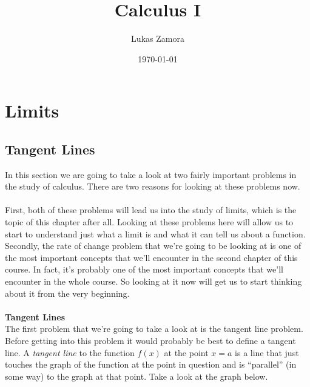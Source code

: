 \documentclass[10pt,reqno]{book}
\title{Calculus I}
\author{Lukas Zamora}
\date{\today}
\begin{document}
	
	\maketitle
	\tableofcontents
	
	\chapter{Limits}\normalsize

	\section{Tangent Lines}

	In this section we are going to take a look at two fairly important problems in the study of calculus. There are two reasons for looking at these problems now. \\ \\
	First, both of these problems will lead us into the study of limits, which is the topic of this chapter after all. Looking at these problems here will allow us to start to understand just what a limit is and what it can tell us about a function. Secondly, the rate of change problem that we're going to be looking at is one of the most important concepts that we'll encounter in the second chapter of this course. In fact, it’s probably one of the most important concepts that we'll encounter in the whole course. So looking at it now will get us to start thinking about it from the very beginning.\\ \\
	\textbf{Tangent Lines}\\
	The first problem that we're going to take a look at is the tangent line problem. Before getting into this problem it would probably be best to define a tangent line. A \textit{tangent line} to the function $ f(x) $ at the point $ x = a $ is a line that just touches the graph of the function at the point in question and is ``parallel'' (in some way) to the graph at that point. Take a look at the graph below.
	\begin{center}
	\end{center}
\end{document}
